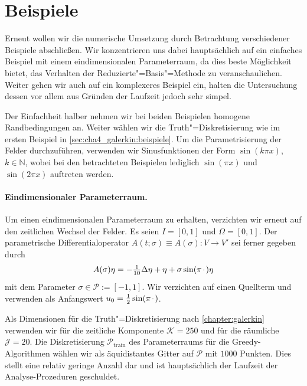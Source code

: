 \documentclass[../main.tex]{subfiles}
\begin{document}
\section{Beispiele} %
\label{sec:cha5_rbm:beispiele}

Erneut wollen wir die numerische Umsetzung durch Betrachtung verschiedener Beispiele abschließen.
Wir konzentrieren uns dabei hauptsächlich auf ein einfaches Beispiel mit einem eindimensionalen Parameterraum, da dies beste Möglichkeit bietet, das Verhalten der Reduzierte"=Basis"=Methode zu veranschaulichen.
Weiter gehen wir auch auf ein komplexeres Beispiel ein, halten die Untersuchung dessen vor allem aus Gründen der Laufzeit jedoch sehr simpel.

Der Einfachheit halber nehmen wir bei beiden Beispielen homogene Randbedingungen an.
Weiter wählen wir die Truth"=Diskretisierung wie im ersten Beispiel in \cref{sec:cha4_galerkin:beispiele}.
Um die Parametrisierung der Felder durchzuführen, verwenden wir Sinusfunktionen der Form $\sin(k \pi x)$, $k \in \mathbb{N}$, wobei bei den betrachteten Beispielen lediglich $\sin(\pi x)$ und $\sin(2 \pi x)$ auftreten werden.

\paragraph{Eindimensionaler Parameterraum.} %

Um einen eindimensionalen Parameterraum zu erhalten, verzichten wir erneut auf den zeitlichen Wechsel der Felder.
Es seien $I = [0, 1]$ und $\Omega = [0, 1]$.
Der parametrische Differentialoperator $A(t; \sigma) \equiv A(\sigma) \colon V \to V'$ sei ferner gegeben durch
\begin{equation}
    A(\sigma) \eta = - \tfrac{1}{10} \Delta \eta + \eta + \sigma \sin(\pi {\mkern2mu\cdot\mkern2mu}) \eta
\end{equation}
mit dem Parameter $\sigma \in \mathcal P := [-1, 1]$.
Wir verzichten auf einen Quellterm und verwenden als Anfangswert $u_{0} = \tfrac{1}{2} \sin(\pi {\mkern2mu\cdot\mkern2mu})$.

Als Dimensionen für die Truth"=Diskretisierung nach \cref{chapter:galerkin} verwenden wir für die zeitliche Komponente $\mathcal K = 250$ und für die räumliche $\mathcal J = 20$.
Die Diskretisierung $\mathcal P_{\mathrm{train}}$ des Parameterraums für die Greedy-Algorithmen wählen wir als äquidistantes Gitter auf $\mathcal P$ mit $1000$ Punkten.
Dies stellt eine relativ geringe Anzahl dar und ist hauptsächlich der Laufzeit der Analyse-Prozeduren geschuldet.
\end{document}
